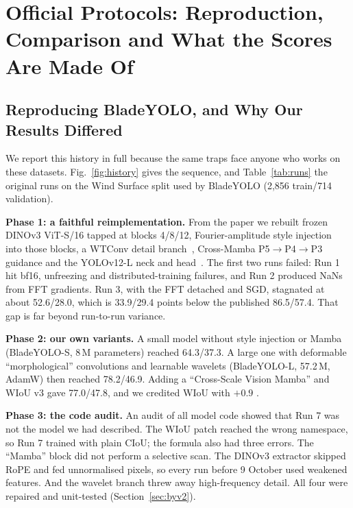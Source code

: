 \section{Official Protocols: Reproduction, Comparison and What the Scores Are Made Of}
\label{sec:official}

\subsection{Reproducing BladeYOLO, and Why Our Results Differed}
\label{sec:history}
We report this history in full because the same traps face anyone who works on these datasets. Fig.~\ref{fig:history} gives the sequence, and Table~\ref{tab:runs} the original runs on the Wind Surface split used by BladeYOLO (2{,}856 train/714 validation).

\textbf{Phase 1: a faithful reimplementation.} From the paper we rebuilt frozen DINOv3 ViT-S/16 tapped at blocks 4/8/12, Fourier-amplitude style injection into those blocks, a WTConv detail branch~\cite{wtconv}, Cross-Mamba P5$\rightarrow$P4$\rightarrow$P3 guidance and the YOLOv12-L neck and head~\cite{bladeyolo}. The first two runs failed: Run 1 hit bf16, unfreezing and distributed-training failures, and Run 2 produced NaNs from FFT gradients. Run 3, with the FFT detached and SGD, stagnated at about 52.6/28.0, which is 33.9/29.4 points below the published 86.5/57.4. That gap is far beyond run-to-run variance.

\textbf{Phase 2: our own variants.} A small model without style injection or Mamba (BladeYOLO-S, 8\,M parameters) reached 64.3/37.3. A large one with deformable ``morphological'' convolutions and learnable wavelets (BladeYOLO-L, 57.2\,M, AdamW) then reached 78.2/46.9. Adding a ``Cross-Scale Vision Mamba'' and WIoU v3 gave 77.0/47.8, and we credited WIoU with $+0.9$ \mcoco.

\textbf{Phase 3: the code audit.} An audit of all model code showed that Run 7 was not the model we had described. The WIoU patch reached the wrong namespace, so Run 7 trained with plain CIoU; the formula also had three errors. The ``Mamba'' block did not perform a selective scan. The DINOv3 extractor skipped RoPE and fed unnormalised pixels, so every run before 9 October used weakened features. And the wavelet branch threw away high-frequency detail. All four were repaired and unit-tested (Section~\ref{sec:byv2}).

